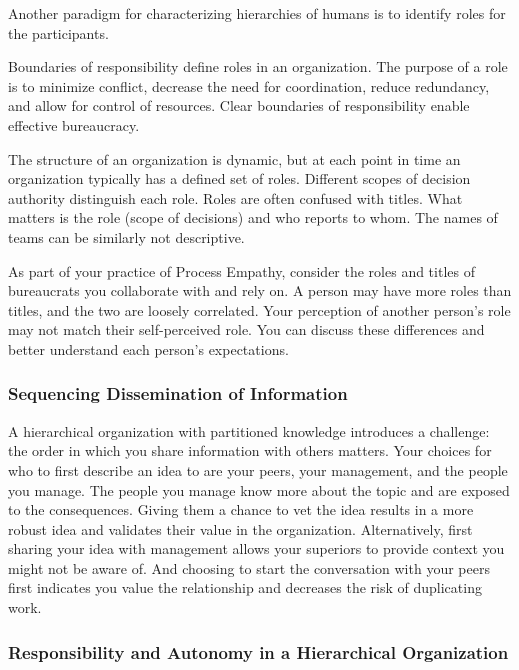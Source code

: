Another paradigm for characterizing hierarchies of humans is to identify roles for the participants. 

Boundaries of responsibility define roles in an organization. The purpose of a role is to minimize conflict, decrease the need for coordination, reduce redundancy, and allow for control of resources. Clear boundaries of responsibility  enable effective bureaucracy. 

The structure of an organization is dynamic, but at each point in time an organization typically has a defined set of roles. Different scopes of decision authority distinguish each role. 
Roles are often confused with titles. What matters is the role (scope of decisions) and who reports to whom. The names of teams can be similarly not descriptive.

As part of your practice of Process Empathy, consider the roles and titles of bureaucrats you collaborate with and rely on. A person may have more roles than titles, and the two are loosely correlated. Your perception of another person's role may not match their self-perceived role. You can discuss these differences and better understand each person's expectations. 


\subsubsection*{Sequencing Dissemination of Information}

A hierarchical organization with partitioned knowledge introduces a challenge: the order in which you share information with others matters. Your choices for who to first describe an idea to are your peers, your management, and the people you manage. 
% 
%
The people you manage know more about the topic and are exposed to the consequences. Giving them a chance to vet the idea results in a more robust idea and validates their value in the organization. Alternatively, first sharing your idea with management  allows your superiors to provide context you might not be aware of. And choosing to  start the conversation with your peers first indicates you value the relationship and decreases the risk of duplicating work.


\subsubsection*{Responsibility and Autonomy in a Hierarchical Organization}

